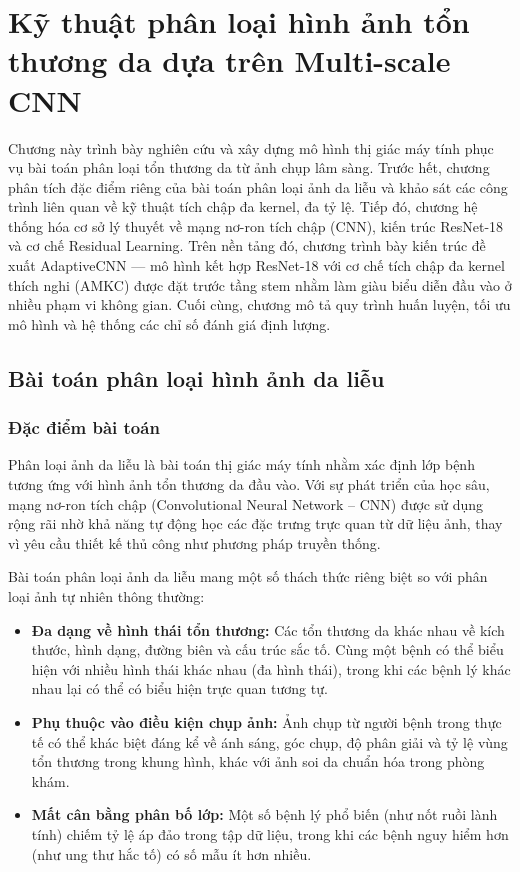 \chapter[\MakeUppercase{Kỹ thuật phân loại hình ảnh tổn thương da dựa trên Multi-scale CNN}]{Kỹ thuật phân loại hình ảnh tổn thương da dựa trên Multi-scale CNN}
\label{ch:chuong3}

Chương này trình bày nghiên cứu và xây dựng mô hình thị giác máy tính phục vụ bài toán phân loại tổn thương da từ ảnh chụp lâm sàng. Trước hết, chương phân tích đặc điểm riêng của bài toán phân loại ảnh da liễu và khảo sát các công trình liên quan về kỹ thuật tích chập đa kernel, đa tỷ lệ. Tiếp đó, chương hệ thống hóa cơ sở lý thuyết về mạng nơ-ron tích chập (CNN), kiến trúc ResNet-18 và cơ chế Residual Learning. Trên nền tảng đó, chương trình bày kiến trúc đề xuất AdaptiveCNN --- mô hình kết hợp ResNet-18 với cơ chế tích chập đa kernel thích nghi (AMKC) được đặt trước tầng stem nhằm làm giàu biểu diễn đầu vào ở nhiều phạm vi không gian. Cuối cùng, chương mô tả quy trình huấn luyện, tối ưu mô hình và hệ thống các chỉ số đánh giá định lượng.

\section{Bài toán phân loại hình ảnh da liễu}

\subsection{Đặc điểm bài toán}

Phân loại ảnh da liễu là bài toán thị giác máy tính nhằm xác định lớp bệnh tương ứng với hình ảnh tổn thương da đầu vào. Với sự phát triển của học sâu, mạng nơ-ron tích chập (Convolutional Neural Network -- CNN) được sử dụng rộng rãi nhờ khả năng tự động học các đặc trưng trực quan từ dữ liệu ảnh, thay vì yêu cầu thiết kế thủ công như phương pháp truyền thống.

Bài toán phân loại ảnh da liễu mang một số thách thức riêng biệt so với phân loại ảnh tự nhiên thông thường:
\begin{itemize}
  \item \textbf{Đa dạng về hình thái tổn thương:} Các tổn thương da khác nhau về kích thước, hình dạng, đường biên và cấu trúc sắc tố. Cùng một bệnh có thể biểu hiện với nhiều hình thái khác nhau (đa hình thái), trong khi các bệnh lý khác nhau lại có thể có biểu hiện trực quan tương tự.
  \item \textbf{Phụ thuộc vào điều kiện chụp ảnh:} Ảnh chụp từ người bệnh trong thực tế có thể khác biệt đáng kể về ánh sáng, góc chụp, độ phân giải và tỷ lệ vùng tổn thương trong khung hình, khác với ảnh soi da chuẩn hóa trong phòng khám.
  \item \textbf{Mất cân bằng phân bố lớp:} Một số bệnh lý phổ biến (như nốt ruồi lành tính) chiếm tỷ lệ áp đảo trong tập dữ liệu, trong khi các bệnh nguy hiểm hơn (như ung thư hắc tố) có số mẫu ít hơn nhiều.
\end{itemize}


